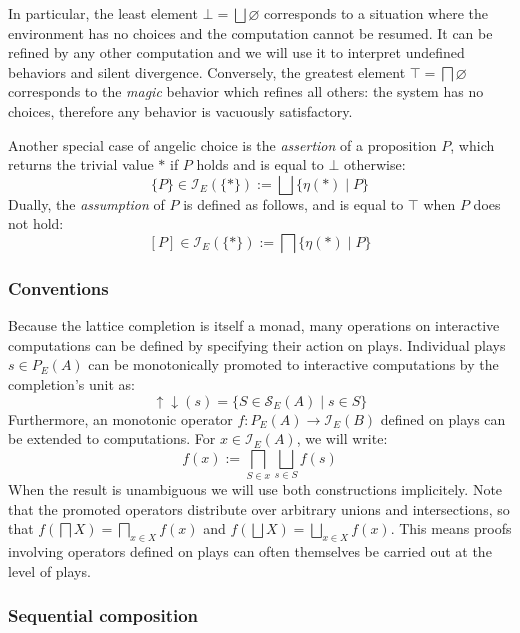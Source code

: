 \documentclass[sigplan,10pt,review,anonymous]{acmart}
\begin{document}
In particular,
the least element $\bot = \bigsqcup \varnothing$
corresponds to a situation where the environment has no choices
and the computation cannot be resumed.
It can be refined by any other computation and
we will use it to interpret undefined behaviors and silent divergence.
Conversely,
the greatest element $\top = \bigsqcap \varnothing$
corresponds to the \emph{magic} behavior
which refines all others:
the system has no choices,
therefore any behavior is vacuously satisfactory.

Another special case of angelic choice is
the \emph{assertion} of a proposition $P$,
which returns the trivial value $*$ if $P$ holds
and is equal to $\bot$ otherwise:
\[ \{P\} \in \mathcal{I}_E(\{*\}) :=
    \bigsqcup \{ \eta(*) \mid P \} \]
Dually,
the \emph{assumption} of $P$
is defined as follows,
and is equal to $\top$ when $P$ does not hold:
\[ [P] \in \mathcal{I}_E(\{*\}) :=
    \bigsqcap \{ \eta(*) \mid P \} \]

\subsubsection{Conventions}

Because the lattice completion is itself a monad,
many operations on interactive computations
can be defined by specifying their action on plays.
Individual plays $s \in P_E(A)$ can be monotonically promoted to
interactive computations by the completion's unit as:
\[
    {\uparrow \downarrow}(s) =
      \{ S \in \mathcal{S}_E(A) \mid s \in S \}
\]
Furthermore,
an monotonic operator $f : P_E(A) \rightarrow \mathcal{I}_E(B)$
defined on plays can be extended to computations.
For $x \in \mathcal{I}_E(A)$, we will write:
\[
  f(x) := \bigsqcap_{S \in x} \bigsqcup_{s \in S} f(s)
\]
When the result is unambiguous we will use both constructions
implicitely.
Note that the promoted operators
distribute over arbitrary unions and intersections, so that
$f(\bigsqcap X) = \bigsqcap_{x \in X} f(x)$ and
$f(\bigsqcup X) = \bigsqcup_{x \in X} f(x)$.
This means proofs involving operators defined on plays
can often themselves be carried out at the level of plays.

\subsubsection{Sequential composition}
\end{document}
